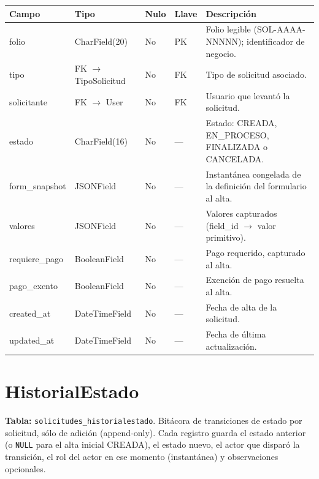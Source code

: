 \documentclass[12pt,letterpaper]{report}
\begin{document}
\begin{longtable}{L{2.9cm} L{2.6cm} C{1.0cm} C{1.0cm} L{6.6cm}}
\toprule
\textbf{Campo} & \textbf{Tipo} & \textbf{Nulo} & \textbf{Llave} & \textbf{Descripción} \\
\midrule
\endhead
folio & CharField(20) & No & PK & Folio legible (SOL-AAAA-NNNNN); identificador de negocio. \\
tipo & FK $\rightarrow$ TipoSolicitud & No & FK & Tipo de solicitud asociado. \\
solicitante & FK $\rightarrow$ User & No & FK & Usuario que levantó la solicitud. \\
estado & CharField(16) & No & --- & Estado: CREADA, EN\_PROCESO, FINALIZADA o CANCELADA. \\
form\_snapshot & JSONField & No & --- & Instantánea congelada de la definición del formulario al alta. \\
valores & JSONField & No & --- & Valores capturados (field\_id $\rightarrow$ valor primitivo). \\
requiere\_pago & BooleanField & No & --- & Pago requerido, capturado al alta. \\
pago\_exento & BooleanField & No & --- & Exención de pago resuelta al alta. \\
created\_at & DateTimeField & No & --- & Fecha de alta de la solicitud. \\
updated\_at & DateTimeField & No & --- & Fecha de última actualización. \\
\bottomrule
\end{longtable}

\section{HistorialEstado}

\textbf{Tabla:} \texttt{solicitudes\_historialestado}. Bitácora de
transiciones de estado por solicitud, sólo de adición (append-only). Cada
registro guarda el estado anterior (o \texttt{NULL} para el alta inicial
CREADA), el estado nuevo, el actor que disparó la transición, el rol del actor
en ese momento (instantánea) y observaciones opcionales.
\end{document}
